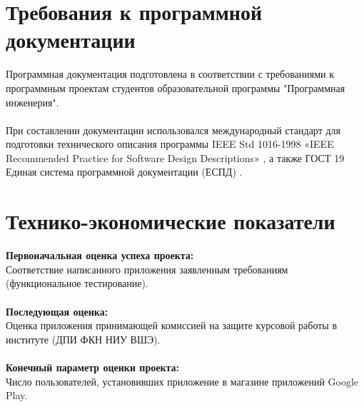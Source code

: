 \documentclass[draft]{article}
\begin{document}
\section {Требования к программной документации}
Программная документация подготовлена в соответствии с требованиями к программным проектам студентов образовательной программы "{}Программная инженерия"{}.\\
~\\
При составлении документации использовался международный стандарт для подготовки технического описания программы IEEE Std 1016-1998 «IEEE Recommended Practice for Software Design Descriptions» \cite{litlink12}, а также ГОСТ 19 Единая система программной документации (ЕСПД) \cite{litlink13}.
\newpage
\section {Технико-экономические показатели}
\textbf{Первоначальная оценка успеха проекта:}\\
Соответствие написанного приложения заявленным требованиям (функциональное тестирование).\\
~\\
\textbf{Последующая оценка:}\\
Оценка приложения принимающей комиссией на защите курсовой работы в институте (ДПИ ФКН НИУ ВШЭ).\\
~\\
\textbf{Конечный параметр оценки проекта:}\\
Число пользователей, установивших приложение в магазине приложений Google Play.\\
\newpage
\end{document}
